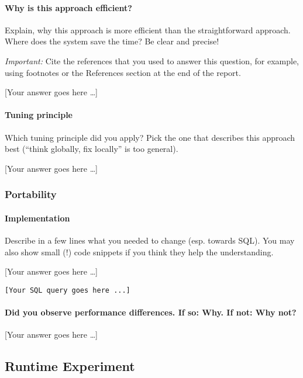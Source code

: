 \documentclass[11pt]{scrartcl}
\newcommand{\youranswerhere}{[Your answer goes here \ldots]}
\begin{document}
\paragraph{Why is this approach efficient?}

Explain, why this approach is more efficient than the straightforward approach. Where does the system save the time? Be clear and precise!

\emph{Important:} Cite the references that you used to answer this question, for example, using footnotes or the References section at the end of the report.

\youranswerhere{}

\paragraph{Tuning principle}

Which tuning principle did you apply? Pick the one that describes this approach best (``think globally, fix locally'' is too general).

\youranswerhere{}

\subsubsection*{Portability}

\paragraph{Implementation}

Describe in a few lines what you needed to change (esp. towards SQL). You may also show small (!) code snippets if you think they help the understanding.

\youranswerhere

\begin{lstlisting}[style=dbtsql]
[Your SQL query goes here ...]
\end{lstlisting}

\paragraph{Did you observe performance differences. If so: Why. If not: Why not?}



\youranswerhere{}

\subsection*{Runtime Experiment}
\end{document}
